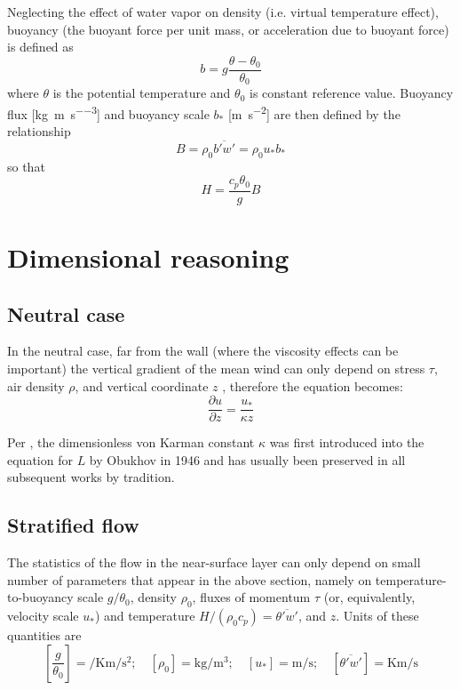 \documentclass{article}
\newcommand{\pderiv}[2]{\frac{\partial #1}{\partial #2}} %
\newcommand{\vonkarman}{\kappa} %
\newcommand{\pt}{\theta} %
\newcommand{\ustar}{\ensuremath{u_*}} %
\newcommand{\bstar}{\ensuremath{b_*}} %
\begin{document}
Neglecting the effect of water vapor on density (i.e. virtual temperature effect), buoyancy (the buoyant force per unit mass, or acceleration due to buoyant force) is defined as
\begin{equation}
    b = g \frac{\theta - \theta_0}{\theta_0}
\end{equation}
where $\theta$ is the potential temperature and $\theta_0$ is constant reference value. Buoyancy flux [\si{\kg\per\m\per\s\cubed}] and buoyancy scale $\bstar$ [\si{\m\per\s\squared}] are then defined by the relationship
\begin{equation}\label{eq:bstar}
    B = \rho_0 \overline{b' w'} = \rho_0 \ustar \bstar
\end{equation}
so that
\begin{equation}
    H = \frac{c_p \theta_0}{g} B
\end{equation}

\section{Dimensional reasoning}

\subsection{Neutral case}
In the neutral case, far from the wall (where the viscosity effects can be important) the vertical gradient of the mean wind can only depend on stress $\tau$, air density $\rho$, and vertical coordinate $z$ \cite[see][section 5.3]{Monin1971}, therefore the equation becomes:
\begin{equation}
   \pderiv{u}{z} = \frac{\ustar}{\vonkarman z}
\end{equation}

Per \cite{Monin1971}, the dimensionless von Karman constant $\vonkarman$ was first introduced into the equation for $L$ by Obukhov in 1946 and has usually been preserved in all subsequent works by tradition.

\subsection{Stratified flow}
The statistics of the flow in the near-surface layer can only depend on small number of parameters that appear in the above section, namely on temperature-to-buoyancy scale $g/\pt_0$, density $\rho_0$, fluxes of momentum $\tau$ (or, equivalently, velocity scale $\ustar$) and temperature $H/(\rho_0 c_p)=\overline{\pt'w'}$, and $z$. Units of these quantities are
\begin{equation}
    \left[\frac{g}{\pt_0}\right] = \si{\per\K\m\per\s\squared}; \quad
    \left[\rho_0\right] = \si{\kg\per\m\cubed}; \quad
    \left[\ustar\right] = \si{\m\per\s}; \quad
    \left[\overline{\pt'w'}\right] = \si{\K\m\per\s}
\end{equation}
\end{document}
